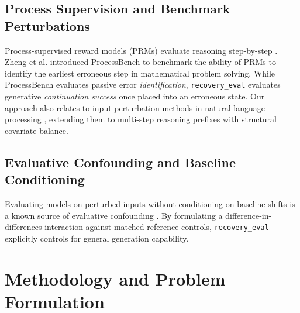 \documentclass[conference]{IEEEtran}
\begin{document}
\subsection{Process Supervision and Benchmark Perturbations}
Process-supervised reward models (PRMs) evaluate reasoning step-by-step \cite{lightman2023process, wang2024mathshepherd}. Zheng et al. \cite{zheng2024processbench} introduced ProcessBench to benchmark the ability of PRMs to identify the earliest erroneous step in mathematical problem solving. While ProcessBench evaluates passive error \textit{identification}, \texttt{recovery\_eval} evaluates generative \textit{continuation success} once placed into an erroneous state. Our approach also relates to input perturbation methods in natural language processing \cite{ribeiro2020beyond, gardner2020evaluating}, extending them to multi-step reasoning prefixes with structural covariate balance.

\subsection{Evaluative Confounding and Baseline Conditioning}
Evaluating models on perturbed inputs without conditioning on baseline shifts is a known source of evaluative confounding \cite{madaan2023selfrefine, shinn2023reflexion}. By formulating a difference-in-differences interaction against matched reference controls, \texttt{recovery\_eval} explicitly controls for general generation capability.

\section{Methodology and Problem Formulation}
\end{document}
